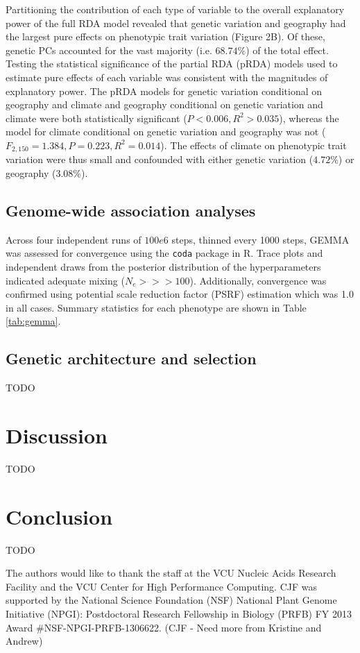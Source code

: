 \documentclass[smallextended]{svjour3}
\begin{document}
Partitioning the contribution of each type of variable to the overall
explanatory power of the full RDA model revealed that
genetic variation and geography had the largest pure effects on phenotypic trait
variation (Figure 2B). Of these, genetic PCs accounted for the vast majority
(i.e. $68.74\%$) of the total effect. Testing the statistical significance of
the partial RDA (pRDA) models used to estimate pure effects of each variable was
consistent with the magnitudes of explanatory power. The pRDA models for genetic
variation conditional on geography and climate and geography conditional on
genetic variation and climate were both statistically significant ($P < 0.006,
R^2 > 0.035$), whereas the model for climate conditional on genetic variation
and geography was not ($F_{2,150} = 1.384, P = 0.223, R^2 = 0.014$). The effects
of climate on phenotypic trait variation were thus small and confounded with
either genetic variation ($4.72\%$) or geography ($3.08\%$).


\subsection*{Genome-wide association analyses}
Across four independent runs of $100e6$ steps, thinned every 1000 steps, GEMMA was assessed 
for convergence using the \texttt{coda} \citep[][version 0.18.1]{coda} package in R. Trace plots and independent 
draws from the posterior distribution of the hyperparameters indicated adequate mixing 
($N_e >>> 100$). Additionally, convergence was confirmed using potential scale reduction factor 
(PSRF) estimation which was 1.0 in all cases.  Summary statistics for each phenotype are shown 
in Table \ref{tab:gemma}.

\subsection*{Genetic architecture and selection}
TODO

\section*{Discussion}
TODO


\section*{Conclusion}
TODO


\begin{acknowledgements} The authors would like to thank the staff at
the VCU Nucleic Acids Research Facility and the
VCU Center for High Performance Computing.  CJF was supported by the National
Science Foundation (NSF) National Plant Genome Initiative (NPGI): Postdoctoral
Research Fellowship in Biology (PRFB) FY 2013 Award \#NSF-NPGI-PRFB-1306622.
(CJF - Need more from Kristine and Andrew)
\end{acknowledgements}
\end{document}
